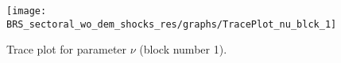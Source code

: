 \begin{figure}[H]
\centering
  \texttt{[image: BRS\_sectoral\_wo\_dem\_shocks\_res/graphs/TracePlot\_nu\_blck\_1]}\\
    \caption{Trace plot for parameter $\nu$ (block number 1).}
\end{figure}
